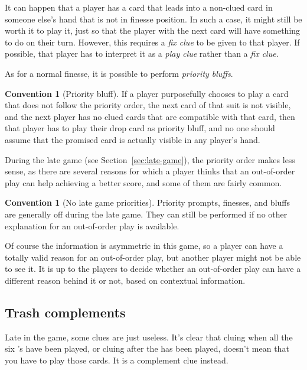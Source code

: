 \documentclass[a4paper]{article}
\theoremstyle{plain}
\theoremstyle{definition}
\newtheorem{convention}[theorem]{Convention}
\begin{document}
It can happen that a player has a card that leads into a non-clued card in someone else's hand that is not in finesse position. In such a case, it might still be worth it to play it, just so that the player with the next card will have something to do on their turn. However, this requires a \emph{fix clue} to be given to that player. If possible, that player has to interpret it as a \emph{play clue} rather than a \emph{fix clue}.


As for a normal finesse, it is possible to perform \emph{priority bluffs}.

\begin{convention}[Priority bluff]
	If a player purposefully chooses to play a card that does not follow the priority order, the next card of that suit is not visible, and the next player has no clued cards that are compatible with that card, then that player has to play their drop card as priority bluff, and no one should assume that the promised card is actually visible in any player's hand.
\end{convention}

During the late game (see Section~\ref{sec:late-game}), the priority order makes less sense, as there are several reasons for which a player thinks that an out-of-order play can help achieving a better score, and some of them are fairly common.

\begin{convention}[No late game priorities]
	Priority prompts, finesses, and bluffs are generally off during the late game. They can still be performed if no other explanation for an out-of-order play is available.
\end{convention}

Of course the information is asymmetric in this game, so a player can have a totally valid reason for an out-of-order play, but another player might not be able to see it. It is up to the players to decide whether an out-of-order play can have a different reason behind it or not, based on contextual information.

\subsection{Trash complements}

Late in the game, some clues are just useless. It's clear that cluing  when all the six 's have been played, or cluing  after the  has been played, doesn't mean that you have to play those cards. It is a complement clue instead.
\end{document}
